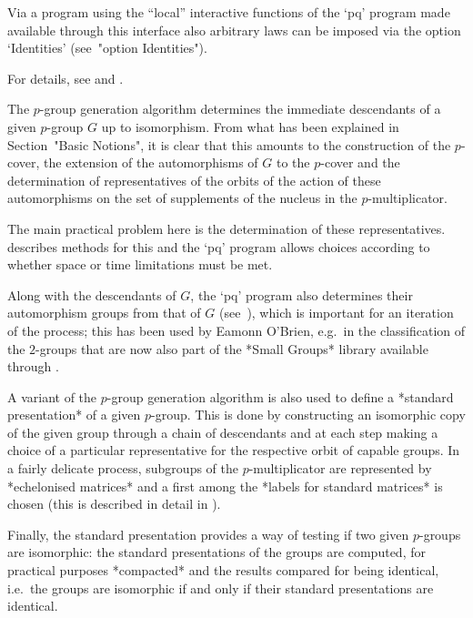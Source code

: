 Via a {\GAP} program using the ``local'' interactive functions of  the
`pq' program made available through this interface also arbitrary laws
can be imposed via the option `Identities' (see~"option Identities").


For details, see \cite{New77} and \cite{OBr90}.

The  $p$-group   generation   algorithm   determines   the   immediate
descendants of a given $p$-group $G$ up to isomorphism. From what  has
been explained in Section~"Basic  Notions",  it  is  clear  that  this
amounts to the construction of the $p$-cover,  the  extension  of  the
automorphisms of  $G$  to  the  $p$-cover  and  the  determination  of
representatives of the orbits of the action of these automorphisms  on
the set of supplements of the nucleus in the $p$-multiplicator.

The  main  practical  problem  here  is  the  determination  of  these
representatives. \cite{OBr90} describes methods for this and the  `pq'
program allows choices according to whether space or time  limitations
must be met.

Along with the descendants of $G$, the `pq'  program  also  determines
their automorphism groups from that of $G$  (see~\cite{OBr95}),  which
is important for an iteration of the process; this has  been  used  by
Eamonn O'Brien, e.g.~in the classification of the $2$-groups that  are
now also part of the *Small Groups* library available through {\GAP}.

A variant of the $p$-group generation algorithm is also used to define
a *standard presentation* of  a  given  $p$-group.  This  is  done  by
constructing an isomorphic copy of the given group through a chain  of
descendants  and  at  each  step  making  a  choice  of  a  particular
representative for the respective orbit of capable groups. In a fairly
delicate process, subgroups of the $p$-multiplicator  are  represented
by *echelonised matrices* and a first among the *labels  for  standard
matrices* is chosen (this is described in detail in \cite{OBr94}).

Finally, the standard presentation provides a way of  testing  if  two
given $p$-groups are isomorphic: the  standard  presentations  of  the
groups are  computed,  for  practical  purposes  *compacted*  and  the
results compared for being identical, i.e.~the groups  are  isomorphic
if and only if their standard presentations are identical.


